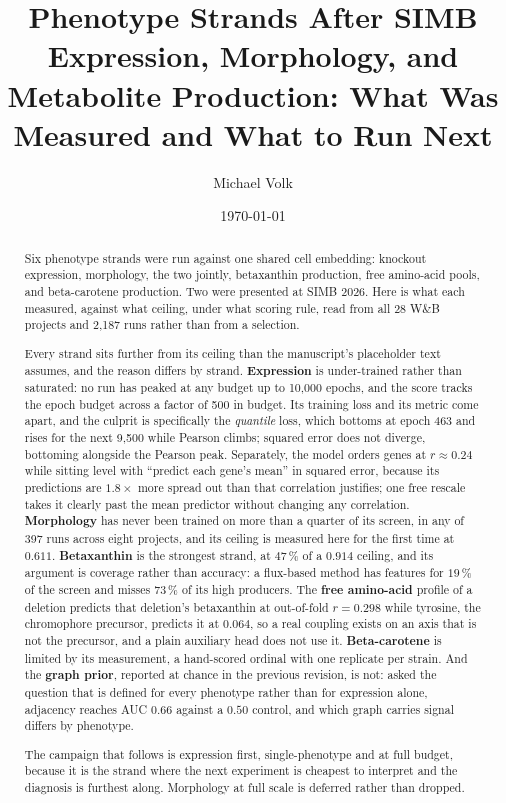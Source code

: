 \documentclass[10pt,a4paper]{article}
\title{\vspace{-1.5em}Phenotype Strands After SIMB\\
  {\large Expression, Morphology, and Metabolite Production:
   What Was Measured and What to Run Next}}
\author{Michael Volk}
\date{\today}
\begin{document}
\maketitle
\thispagestyle{empty}

\begin{abstract}
\noindent
Six phenotype strands were run against one shared cell embedding: knockout expression,
morphology, the two jointly, betaxanthin production, free amino-acid pools, and
beta-carotene production. Two were presented at SIMB 2026. Here is what each measured,
against what ceiling, under what scoring rule, read from all 28 W\&B projects and 2,187
runs rather than from a selection.

Every strand sits further from its ceiling than the manuscript's placeholder text assumes,
and the reason differs by strand. \textbf{Expression} is under-trained rather than
saturated: no run has peaked at any budget up to 10,000 epochs, and the score tracks the
epoch budget across a factor of 500 in budget. Its training loss and its metric come apart,
and the culprit is specifically the \emph{quantile} loss, which bottoms at epoch 463 and
rises for the next 9,500 while Pearson climbs; squared error does not diverge, bottoming
alongside the Pearson peak. Separately, the model orders genes at $r \approx 0.24$ while
sitting level with ``predict each gene's mean'' in squared error, because its predictions are
$1.8\times$ more spread out than that correlation justifies; one free rescale takes it
clearly past the mean predictor without changing any correlation.
\textbf{Morphology} has never been trained on more than a quarter of its screen, in any of
397 runs across eight projects, and its ceiling is measured here for the first time at
$0.611$. \textbf{Betaxanthin} is the strongest strand, at $47\,\%$ of a $0.914$ ceiling, and
its argument is coverage rather than accuracy: a flux-based method has features for
$19\,\%$ of the screen and misses $73\,\%$ of its high producers. The \textbf{free
amino-acid} profile of a deletion predicts that deletion's betaxanthin at out-of-fold
$r = 0.298$ while tyrosine, the chromophore precursor, predicts it at $0.064$, so a real
coupling exists on an axis that is not the precursor, and a plain auxiliary head does not
use it. \textbf{Beta-carotene} is limited by its measurement, a hand-scored ordinal with one
replicate per strain. And the \textbf{graph prior}, reported at chance in the previous
revision, is not: asked the question that is defined for every phenotype rather than for
expression alone, adjacency reaches AUC $0.66$ against a $0.50$ control, and which graph
carries signal differs by phenotype.

The campaign that follows is expression first, single-phenotype and at full budget, because
it is the strand where the next experiment is cheapest to interpret and the diagnosis is
furthest along. Morphology at full scale is deferred rather than dropped.
\end{abstract}
\end{document}
